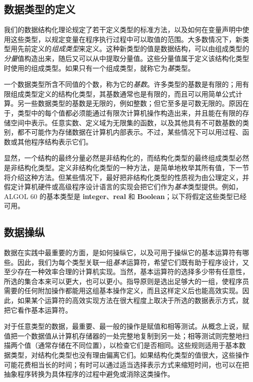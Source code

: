 \documentclass[twoside,11pt,fontset=none]{ctexbook}
\begin{document}
\subsection{数据类型的定义}

我们的数据结构化理论规定了若干定义类型的标准方法，以及如何在变量声明中使用这些类型，以规定变量在程序执行过程中可以取值的范围。大多数情况下，新类型用先前定义的\textit{组成类型}来定义。这种新类型的值是数据结构，可以由组成类型的\textit{分量}值构造出来，随后又可以从中提取分量值。这些分量值属于定义该结构化类型时使用的组成类型。如果只有一个组成类型，就称它为\textit{基}类型。

一个数据类型所含不同值的个数，称为它的\textit{基数}。许多类型的基数是有限的；用有限组成类型定义的结构化类型，其基数通常也是有限的，而且可以用简单公式计算。另一些数据类型的基数是无限的，例如整数；但它至多是可数无限的。原因在于，类型中的每个值都必须能通过有限次计算机操作构造出来，并且能在有限的存储空间中表示。任意实数、定义域为无限集的函数，以及其他具有不可数基数的类别，都不可能作为存储数据在计算机内部表示。不过，某些情况下可以用过程、函数或其他程序结构表示它们。

显然，一个结构的最终分量必然是非结构化的，而结构化类型的最终组成类型必然是非结构化类型。定义非结构化类型的一种方法，是简单地枚举其所有值，下一节将介绍这种方法。但某些情况下，最好把非结构化类型的性质视为由公理定义，并假定计算机硬件或高级程序设计语言的实现会把它们作为\textit{基本}类型提供。例如，ALGOL 60 的基本类型是 \textbf{integer}、\textbf{real} 和 \textbf{Boolean}；以下将假定这些类型已经可用。

\subsection{数据操纵}

数据在实践中最重要的方面，是如何操纵它，以及可用于操纵它的基本运算符有哪些。因此，我们为每个类型关联一组\textit{基本}运算符，希望它们既有助于程序设计，又至少存在一种效率合理的计算机实现。当然，基本运算符的选择多少带有任意性，所选的集合本来可以更大，也可以更小。指导原则是选出足够大的一组，使程序员需要的任何附加操作都能用这组基本操作定义，而且这样定义后也能高效实现。因此，如果某个运算符的高效实现方法在很大程度上取决于所选的数据表示方式，就把它看作基本运算符。

对于任意类型的数据，最重要、最一般的操作是赋值和相等测试。从概念上说，赋值把一个数据值从计算机存储器的一处完整地复制到另一处；相等测试则完整地扫描两个值（通常存储在不同位置），以检查它们是否相同。这些规则适用于基本数据类型，对结构化类型也没有理由偏离它们。如果结构化类型的值很大，这些操作可能花费相当长的时间；有时可以通过适当选择表示方式来缩短时间，也可以在把抽象程序转换为具体程序的过程中避免或消除这类操作。
\end{document}
